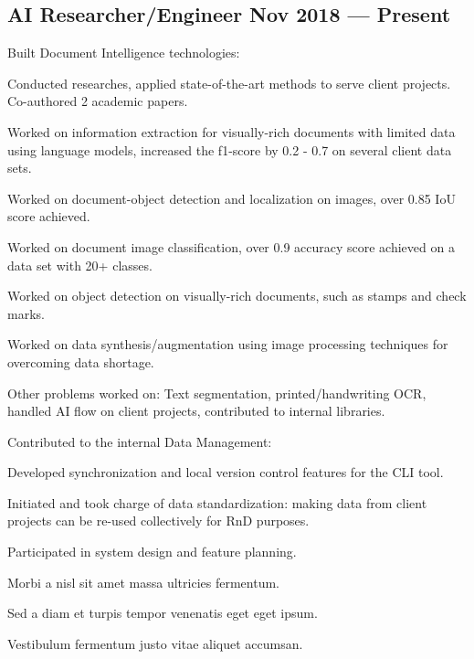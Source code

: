 \subsection{{AI Researcher/Engineer \hfill Nov 2018 --- Present}}
\begin{zitemize}
\item Built Document Intelligence technologies:
    \begin{zitemize}
    \item Conducted researches, applied state-of-the-art methods to serve client projects. Co-authored 2 academic papers.
    \item Worked on information extraction for visually-rich documents with limited data using language models, increased the f1-score by 0.2 - 0.7 on several client data sets.
    \item Worked on document-object detection and localization on images, over 0.85 IoU score achieved.
    \item Worked on document image classification, over 0.9 accuracy score achieved on a data set with 20+ classes.
    \item Worked on object detection on visually-rich documents, such as stamps and check marks.
    \item Worked on data synthesis/augmentation using image processing techniques for overcoming data shortage.
    \item Other problems worked on: Text segmentation, printed/handwriting OCR, handled AI flow on client projects, contributed to internal libraries.
    \end{zitemize}
\item Contributed to the internal Data Management:
\begin{zitemize}
\item Developed synchronization and local version control features for the CLI tool.
\item Initiated and took charge of data standardization: making data from client projects can be re-used collectively for RnD purposes.
\item Participated in system design and feature planning.
\end{zitemize}
\item Morbi a nisl sit amet massa ultricies fermentum.
\item Sed a diam et turpis tempor venenatis eget eget ipsum.
\item Vestibulum fermentum justo vitae aliquet accumsan.
\end{zitemize}


